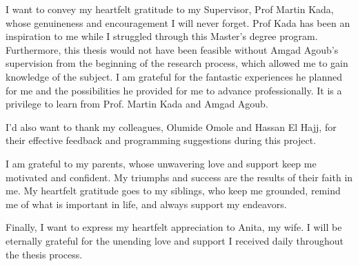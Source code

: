 
I want to convey my heartfelt gratitude to my Supervisor, Prof Martin Kada, whose genuineness and encouragement I will never forget. Prof Kada has been an inspiration to me while I struggled through this Master's degree program. Furthermore, this thesis would not have been feasible without Amgad Agoub's supervision from the beginning of the research process, which allowed me to gain knowledge of the subject. I am grateful for the fantastic experiences he planned for me and the possibilities he provided for me to advance professionally. It is a privilege to learn from Prof. Martin Kada and Amgad Agoub.


I'd also want to thank my colleagues, Olumide Omole and Hassan El Hajj, for their effective feedback and programming suggestions during this project.


I am grateful to my parents, whose unwavering love and support keep me motivated and confident. My triumphs and success are the results of their faith in me. My heartfelt gratitude goes to my siblings, who keep me grounded, remind me of what is important in life, and always support my endeavors.


Finally, I want to express my heartfelt appreciation to Anita, my wife. I will be eternally grateful for the unending love and support I received daily throughout the thesis process.